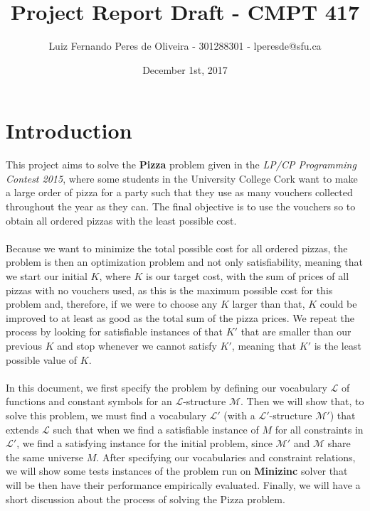 \documentclass[conference]{IEEEtran}
\title{Project Report Draft - CMPT 417}
\author{Luiz Fernando Peres de Oliveira - 301288301 - lperesde@sfu.ca}
\date{December 1st, 2017}
\newcommand\tab[1][0.3cm]{\hspace*{#1}}
\begin{document}
\maketitle
\section{Introduction}
This project aims to solve the \textbf{Pizza} problem given in the \textit{LP/CP Programming Contest 2015}, where some students in the University College Cork want to make a large order of pizza for a party such that they use as many vouchers collected throughout the year as they can. The final objective is to use the vouchers so to obtain all ordered pizzas with the least possible cost.
\\
\\
\tab Because we want to minimize the total possible cost for all ordered pizzas, the problem is then an optimization problem and not only satisfiability, meaning that we start our initial $K$, where $K$ is our target cost, with the sum of prices of all pizzas with no vouchers used, as this is the maximum possible cost for this problem and, therefore, if we were to choose any $K$ larger than that, $K$ could be improved to at least as good as the total sum of the pizza prices. We repeat the process by looking for satisfiable instances of that $K'$ that are smaller than our previous $K$ and stop whenever we cannot satisfy $K'$, meaning that $K'$ is the least possible value of $K$.
\\
\\
\tab In this document, we first specify the problem by defining our vocabulary $\mathcal{L}$ of functions and constant symbols for an $\mathcal{L}$-structure $\mathcal{M}$. Then we will show that, to solve this problem, we must find a vocabulary $\mathcal{L'}$ (with a $\mathcal{L'}$-structure $\mathcal{M'}$) that extends $\mathcal{L}$ such that when we find a satisfiable instance of $M$ for all constraints in $\mathcal{L'}$, we find a satisfying instance for the initial problem, since $\mathcal{M'}$ and $\mathcal{M}$ share the same universe $M$. After specifying our vocabularies and constraint relations, we will show some tests instances of the problem run on \textbf{Minizinc} solver that will be then have their performance empirically evaluated. Finally, we will have a short discussion about the process of solving the Pizza problem.
\end{document}
